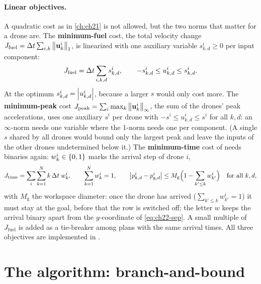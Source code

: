 \paragraph{Linear objectives.}
A quadratic cost as in \cref{ch:ch21} is not allowed, but the two norms that
matter for a drone are. The \textbf{minimum-fuel} cost, the total velocity change $J_{\mathrm{fuel}} = \Delta t
\sum_{i,k} \left\lVert \mathbf{u}^i_k \right\rVert_1$, is linearized with one auxiliary variable
$s^i_{k,d} \ge 0$ per input component:
\begin{equation}
  J_{\mathrm{fuel}} = \Delta t \sum_{i,k,d} s^i_{k,d}, \qquad
  -s^i_{k,d} \le u^i_{k,d} \le s^i_{k,d}.
  \label{eq:ch22-fuel}
\end{equation}
At the optimum $s^i_{k,d} = \left\lvert u^i_{k,d} \right\rvert$, because a larger $s$ would only
cost more. The \textbf{minimum-peak} cost $J_{\mathrm{peak}} = \sum_i \max_k
\left\lVert \mathbf{u}^i_k \right\rVert_\infty$, the sum of the drones' peak accelerations, uses one
auxiliary $s^i$ per drone with $-s^i \le u^i_{k,d} \le s^i$ for all $k, d$:
an $\infty$-norm needs one variable where the 1-norm needs one per
component. (A single $s$ shared by all drones would bound only the largest
peak and leave the inputs of the other drones undetermined below it.) The \textbf{minimum-time} cost of \textcite{richards2002aircraft} needs binaries again:
$w^i_k \in \left\{ 0,1 \right\}$ marks the arrival step of drone $i$,
\begin{equation}
  J_{\mathrm{time}} = \sum_{i} \sum_{k=1}^{N} k\,\Delta t\; w^i_k, \qquad
  \sum_{k=1}^{N} w^i_k = 1, \qquad
  \left\lvert p^i_{k,d} - p^i_{\mathrm{g},d} \right\rvert \le M_{\mathrm{g}}
  \Bigl(1 - \sum_{k' \le k} w^i_{k'}\Bigr) \quad \text{for all } k, d,
  \label{eq:ch22-time}
\end{equation}
with $M_{\mathrm{g}}$ the workspace diameter: once the drone has arrived
($\sum_{k' \le k} w^i_{k'} = 1$) it must stay at the goal, before that the
row is switched off; the letter $w$ keeps the arrival binary apart from the
$y$-coordinate of \cref{eq:ch22-sep}. 
A small multiple of $J_{\mathrm{fuel}}$ is added as a
tie-breaker among plans with the same arrival times. All three objectives
are implemented in .

\section{The algorithm: branch-and-bound}
\label{sec:ch22-algorithm}

